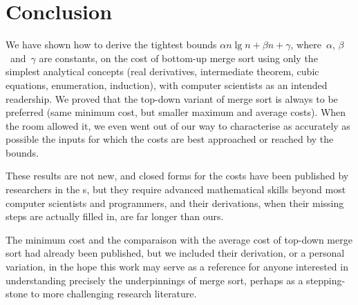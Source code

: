 \section{Conclusion}

We have shown how to derive the tightest bounds \(\alpha n\lg n +
\beta n + \gamma\), where~\(\alpha\), \(\beta\)~and~\(\gamma\) are
constants, on the cost of bottom-up merge sort using only the simplest
analytical concepts (real derivatives, intermediate theorem, cubic
equations, enumeration, induction), with computer scientists as an
intended readership. We proved that the top-down variant of merge sort
is always to be preferred (same minimum cost, but smaller maximum and
average costs). When the room allowed it, we even went out of our way
to characterise as accurately as possible the inputs for which the
costs are best approached or reached by the bounds.

These results are not new, and closed forms for the costs have been
published by researchers in the s, but they require
advanced mathematical skills beyond most computer scientists and
programmers, and their derivations, when their missing steps are
actually filled in, are far longer than ours.

The minimum cost and the comparaison with the average cost of
top-down merge sort had already been published, but we included
their derivation, or a personal variation, in the hope this work may
serve as a reference for anyone interested in understanding precisely
the underpinnings of merge sort, perhaps as a stepping-stone to
more challenging research literature.

